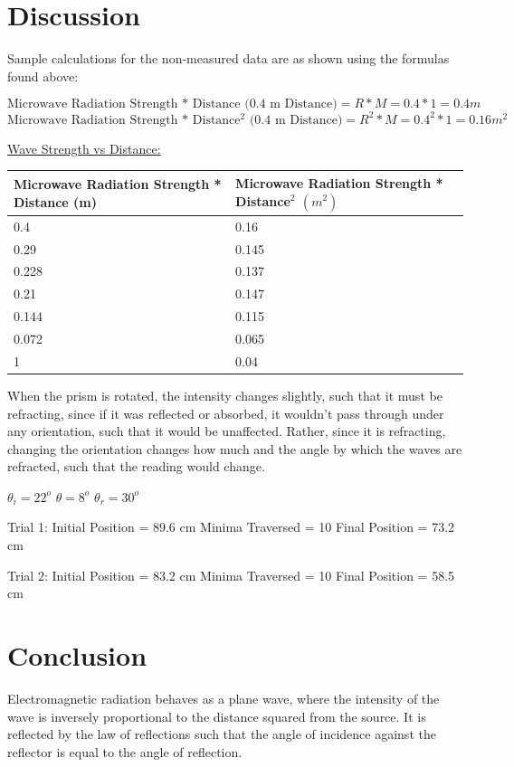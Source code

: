 \documentclass[11pt, titlepage]{article}
\begin{document}
\section*{Discussion}
Sample calculations for the non-measured data are as shown using the formulas found above:

$$\text{Microwave Radiation Strength * Distance (0.4 m Distance)} = R * M = 0.4 * 1 = 0.4 m$$
$$\text{Microwave Radiation Strength * Distance$^2$ (0.4 m Distance)} = R^2 * M = 0.4^2 * 1 = 0.16 m^2$$

\underline{Wave Strength vs Distance:}
\begin{center}
\begin{tabular}
{|m{15em}|m{15em}|}
\hline
Microwave Radiation Strength * Distance (m) & Microwave Radiation Strength * Distance$^2$ $(m^2)$ \\
\hline
0.4 & 0.16\\
\hline
0.29 & 0.145\\
\hline
0.228 & 0.137\\
\hline
0.21 & 0.147\\
\hline
0.144 & 0.115\\
\hline
0.072 & 0.065\\
\hline
1 & 0.04\\
\hline
\end{tabular}
\end{center}

When the prism is rotated, the intensity changes slightly, such that it must be refracting, since if it was reflected or absorbed, it wouldn't pass through under any orientation, such that it would be unaffected. Rather, since it is refracting, changing the orientation changes how much and the angle by which the waves are refracted, such that the reading would change.

$\theta_i = 22^o$
$\theta = 8^o$
$\theta_r = 30^o$

Trial 1:
Initial Position = 89.6 cm
Minima Traversed = 10
Final Position = 73.2 cm

Trial 2:
Initial Position = 83.2 cm
Minima Traversed = 10
Final Position = 58.5 cm

\section*{Conclusion}
Electromagnetic radiation behaves as a plane wave, where the intensity of the wave is inversely proportional to the distance squared from the source. It is reflected by the law of reflections such that the angle of incidence against the reflector is equal to the angle of reflection.
\end{document}
